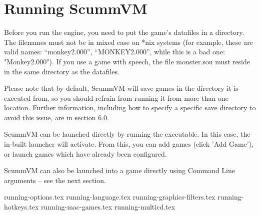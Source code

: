 


\section{Running ScummVM}

Before you run the engine, you need to put the game's datafiles in a
directory. The filenames must not be in mixed case on *nix systems
(for example, these are valid names: ``monkey2.000'', ``MONKEY2.000'', while
this is a bad one: "Monkey2.000"). If you use a game with speech, the file
monster.sou must reside in the same directory as the datafiles.

Please note that by default, ScummVM will save games in the directory
it is executed from, so you should refrain from running it from more than
one location. Further information, including how to specify a specific save
directory to avoid this issue, are in section 6.0.

ScummVM can be launched directly by running the executable. In this case,
the in-built launcher will activate. From this, you can add games (click
'Add Game'), or launch games which have already been configured.

ScummVM can also be launched into a game directly using Command Line
arguments -- see the next section.

 {running-options.tex}
 {running-language.tex}
 {running-graphics-filters.tex}
 {running-hotkeys.tex}
 {running-mac-games.tex}
 {running-multicd.tex}
